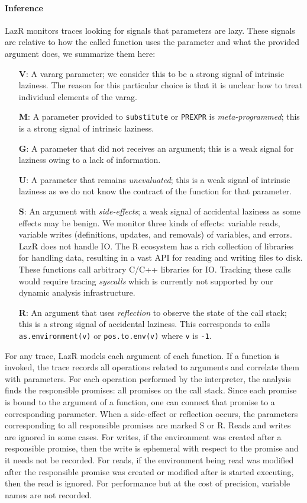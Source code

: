 \documentclass[review,creen,acmsmall]{acmart}
\renewcommand{\c}[1]{\lstinline |#1|\xspace}
\newcommand{\lazr}{{\sf LazR}\xspace}
\begin{document}
\paragraph{Inference}
\lazr monitors traces looking for signals that parameters are lazy. These
signals are relative to how the called function uses the parameter and what the
provided argument does, we summarize them here:
\begin{itemize}
\item[{\bf V}:] A vararg parameter; we consider this to be a strong
  signal of intrinsic laziness. The reason for this particular choice is that it
  is unclear how to treat individual elements of the varag.
\item[{\bf M}:] A parameter provided to \c{substitute} or \c{PREXPR} is
  \emph{meta-programmed}; this is a strong signal of intrinsic laziness.
\item[{\bf G}:] A parameter that did not receives an argument; this is a weak
  signal for laziness owing to a lack of information.  
\item[{\bf U}:] A parameter that remains \emph{unevaluated}; this is a weak
  signal of intrinsic laziness as we do not know the contract of the function
  for that parameter.
\item [{\bf S}:] An argument with \emph{side-effects}; a weak signal of
  accidental laziness as some effects may be benign. We monitor three kinds of
  effects: variable reads, variable writes (definitions, updates, and removals)
  of variables, and errors. \lazr does not handle IO. The R ecosystem has a rich
  collection of libraries for handling data, resulting in a vast API for reading
  and writing files to disk. These functions call arbitrary C/C++ libraries for
  IO. Tracking these calls would require tracing \emph{syscalls} which is
  currently not supported by our dynamic analysis infrastructure.
\item[{\bf R}:] An argument that uses \emph{reflection} to observe the state of
  the call stack; this is a strong signal of accidental laziness. This
  corresponds to calls \c{as.environment(v)} or \c{pos.to.env(v)} where \c
  v is \c{-1}. %

\end{itemize}

For any trace, \lazr models each argument of each function. If a function is
invoked, the trace records all operations related to arguments and correlate
them with parameters. For each operation performed by the interpreter, the
analysis finds the responsible promises: all promises on the call stack. Since
each promise is bound to the argument of a function, one can connect that
promise to a corresponding parameter. When a side-effect or reflection occurs,
the parameters corresponding to all responsible promises are marked S or R.
Reads and writes are ignored in some cases. For writes, if the environment was
created after a responsible promise, then the write is ephemeral with respect to the
promise and it needs not be recorded. For reads, if the environment being read
was modified after the responsible promise was created or modified after is
started executing, then the read is ignored. For performance but at the cost of
precision, variable names are not recorded.
\end{document}
